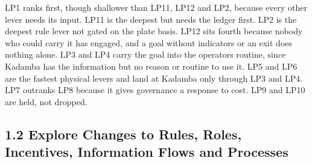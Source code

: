 \documentclass[
  10pt,
  table]{article}
\begin{document}
LP1 ranks first, though shallower than LP11, LP12 and LP2, because every other lever needs its input. LP11 is the deepest but needs the ledger first. LP2 is the deepest rule lever not gated on the plate basis. LP12 sits fourth because nobody who could carry it has engaged, and a goal without indicators or an exit does nothing alone. LP3 and LP4 carry the goal into the operator\textquotesingle s routine, since Kadamba has the information but no reason or routine to use it. LP5 and LP6 are the fastest physical levers and land at Kadamba only through LP3 and LP4. LP7 outranks LP8 because it gives governance a response to cost. LP9 and LP10 are held, not dropped.

\subsection{1.2 Explore Changes to Rules, Roles, Incentives, Information Flows and Processes}\label{explore-changes-to-rules-roles-incentives-information-flows-and-processes}
\end{document}
